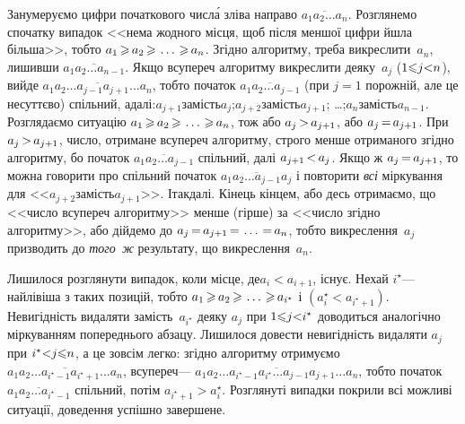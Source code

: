 \documentclass[14pt,a4paper]{extarticle}
\def\dib#1{\,#1\discretionary{}{\mbox{$#1$}}{}\,}
\begin{document}
\label{text:proof-max-num-by-strike-out-one-digit}
Занумеруємо цифри початкового числ\'{а} зліва направо $\overline{a_1a_2\dots{}a_n}$.
Розглянемо спочатку випадок <<нема жодного місця, щоб після меншої цифри йшла більша>>, тобто $a_1\dib{{\>}}a_2\dib{{\>}}\dots\dib{{\>}}a_n$. Згідно алгоритму, треба викреслити~$a_n$, лишивши $\overline{a_1a_2\dots{}a_{n-1}}$. Якщо всупереч алгоритму викреслити деяку~$a_j$ ($1{\leqslant}j{<}n$), вийде $\overline{a_1a_2\dots{}a_{j-1}a_{j+1}\dots{}a_{n}}$, тобто початок $\overline{a_1a_2\dots{}a_{j-1}}$ (при $j{=}1$ порожній, але це несуттєво) спільний, а\nolinebreak[3] далі:\linebreak[1]
$a_{j+1}$\nolinebreak[1] замість\nolinebreak[3] $a_j$;\linebreak[1] 
$a_{j+2}$\nolinebreak[1] замість\nolinebreak[3] $a_{j+1}$;
\dots;\linebreak[1]
$a_{n}$\nolinebreak[1] замість\nolinebreak[3] $a_{n-1}$.
Розглядаємо ситуацію $a_1\dib{{\>}}a_2\dib{{\>}}\dots\dib{{\>}}a_n$, тож або $a_j\dib{{>}}a_{j+1}$, або $a_j\dib{{=}}a_{j+1}$. При $a_j\dib{{>}}a_{j+1}$, число, отримане всупереч алгоритму, строго менше отриманого згідно алгоритму, бо початок $\overline{a_1a_2\dots{}a_{j-1}}$ спільний, далі $a_{j+1}\dib{{<}}a_j$. Якщо ж $a_j\dib{{=}}a_{j+1}$, то можна говорити про спільний початок $\overline{a_1a_2\dots{}a_{j-1}a_j}$ і повторити \emph{всі} міркування для <<$a_{j+2}$\nolinebreak[1] замість\nolinebreak[3] $a_{j+1}$>>. І\nolinebreak[3] так\nolinebreak[2] далі. Кінець кінцем, або десь отримаємо, що <<число всупереч алгоритму>> менше (гірше) за <<число згідно алгоритму>>, або дійдемо до $a_j\dib{{=}}a_{j+1}\dib{{=}}\dots\dib{{=}}a_n$, тобто викреслення~$a_j$ призводить до \emph{того~ж} результату, що викреслення~$a_n$.

Лишилося розглянути випадок, коли місце, де\nolinebreak[3] $a_i{<}a_{i+1}$, існує. Нехай $i^{\star}$\nolinebreak[3] --- найлівіша з таких позицій, тобто $a_1\dib{{\>}}a_2\dib{{\>}}\dots\dib{{\>}}a_{i^{\star}}$ і $(a_i^{\star}{<}a_{i^{\star}+1})$. Невигідність видаляти замість~$a_{i^{\star}}$ деяку $a_j$ при $1{\leqslant}j{<}i^{\star}$ доводиться аналогічно міркуванням попереднього абзацу. Лишилося довести невигідність видаляти $a_j$ при $i^{\star}{<}j{\leqslant}n$, а це зовсім легко: згідно алгоритму отримуємо $\overline{a_1a_2\dots{}a_{i^{\star}-1}a_{i^{\star}+1}\dots{}a_{n}}$, всупереч\nolinebreak[3] --- $\overline{a_1a_2\dots{}a_{i^{\star}-1}a_{i^{\star}}\dots{}a_{j-1}a_{j+1}\dots{}a_{n}}$, тобто початок $\overline{a_1a_2\dots{}a_{i^{\star}-1}}$ спільний, потім ${a_{i^{\star}+1} > a_i^{\star}}$. Розглянуті випадки покрили всі можливі ситуації, доведення успішно завершене.
\end{document}
